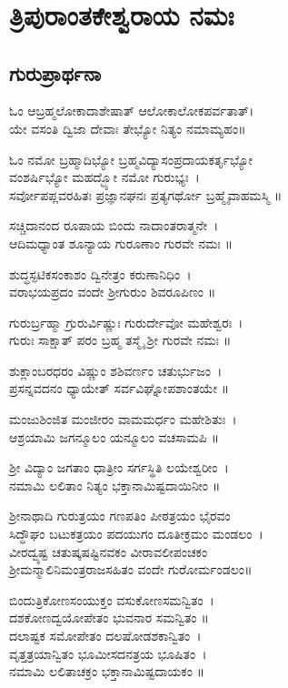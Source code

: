 ‌\setcounter{page}{0}
\thispagestyle{empty}
\fancyhead[RL]{}
\chapter*{\\ ತ್ರಿಪುರಾಂತಕೇಶ್ವರಾಯ ನಮಃ}
\thispagestyle{empty}
\section{ಗುರುಪ್ರಾರ್ಥನಾ}
ಓಂ ಆಬ್ರಹ್ಮಲೋಕಾದಾಶೇಷಾತ್ ಆಲೋಕಾಲೋಕಪರ್ವತಾತ್।\\
ಯೇ ವಸಂತಿ ದ್ವಿಜಾ ದೇವಾಃ ತೇಭ್ಯೋ ನಿತ್ಯಂ ನಮಾಮ್ಯಹಂ॥

ಓಂ ನಮೋ ಬ್ರಹ್ಮಾದಿಭ್ಯೋ ಬ್ರಹ್ಮವಿದ್ಯಾಸಂಪ್ರದಾಯಕರ್ತೃಭ್ಯೋ \\ವಂಶರ್ಷಿಭ್ಯೋ ಮಹದ್ಭ್ಯೋ ನಮೋ ಗುರುಭ್ಯಃ~।\\
ಸರ್ವೋಪಪ್ಲವರಹಿತಃ ಪ್ರಜ್ಞಾನಘನಃ ಪ್ರತ್ಯಗರ್ಥೋ ಬ್ರಹ್ಮೈವಾಹಮಸ್ಮಿ ॥

ಸಚ್ಚಿದಾನಂದ ರೂಪಾಯ ಬಿಂದು ನಾದಾಂತರಾತ್ಮನೇ~।\\
ಆದಿಮಧ್ಯಾಂತ ಶೂನ್ಯಾಯ ಗುರೂಣಾಂ ಗುರವೇ ನಮಃ ॥

ಶುದ್ಧಸ್ಫಟಿಕಸಂಕಾಶಂ ದ್ವಿನೇತ್ರಂ ಕರುಣಾನಿಧಿಂ~।\\
ವರಾಭಯಪ್ರದಂ ವಂದೇ ಶ್ರೀಗುರುಂ ಶಿವರೂಪಿಣಂ ॥

ಗುರುರ್ಬ್ರಹ್ಮಾ ಗ್ರುರುರ್ವಿಷ್ಣುಃ ಗುರುರ್ದೇವೋ ಮಹೇಶ್ವರಃ~।\\
ಗುರುಃ ಸಾಕ್ಷಾತ್ ಪರಂ ಬ್ರಹ್ಮ ತಸ್ಮೈ ಶ್ರೀ ಗುರವೇ ನಮಃ ॥

ಶುಕ್ಲಾಂಬರಧರಂ ವಿಷ್ಣುಂ ಶಶಿವರ್ಣಂ ಚತುರ್ಭುಜಂ~।\\
ಪ್ರಸನ್ನವದನಂ ಧ್ಯಾಯೇತ್ ಸರ್ವವಿಘ್ನೋಪಶಾಂತಯೇ ॥

ಮಂಜುಶಿಂಜಿತ ಮಂಜೀರಂ ವಾಮಮರ್ಧಂ ಮಹೇಶಿತುಃ~।\\
ಆಶ್ರಯಾಮಿ ಜಗನ್ಮೂಲಂ ಯನ್ಮೂಲಂ ವಚಸಾಮಪಿ ॥

ಶ್ರೀ ವಿದ್ಯಾಂ ಜಗತಾಂ ಧಾತ್ರೀಂ ಸರ್ಗಸ್ಥಿತಿ ಲಯೇಶ್ವರೀಂ~।\\
ನಮಾಮಿ ಲಲಿತಾಂ ನಿತ್ಯಂ ಭಕ್ತಾನಾಮಿಷ್ಟದಾಯಿನೀಂ ॥

ಶ್ರೀನಾಥಾದಿ ಗುರುತ್ರಯಂ ಗಣಪತಿಂ ಪೀಠತ್ರಯಂ ಭೈರವಂ\\
ಸಿದ್ಧೌಘಂ ಬಟುಕತ್ರಯಂ ಪದಯುಗಂ ದೂತೀಕ್ರಮಂ ಮಂಡಲಂ~।\\
ವೀರದ್ವ್ಯಷ್ಟ ಚತುಷ್ಕಷಷ್ಟಿನವಕಂ ವೀರಾವಲೀಪಂಚಕಂ\\
ಶ್ರೀಮನ್ಮಾಲಿನಿಮಂತ್ರರಾಜಸಹಿತಂ ವಂದೇ ಗುರೋರ್ಮಂಡಲಂ॥

ಬಿಂದುತ್ರಿಕೋಣಸಂಯುಕ್ತಂ ವಸುಕೋಣಸಮನ್ವಿತಂ~।\\
ದಶಕೋಣದ್ವಯೋಪೇತಂ ಭುವನಾರ ಸಮನ್ವಿತಂ ॥\\
ದಲಾಷ್ಟಕ ಸಮೋಪೇತಂ ದಲಷೋಡಶಕಾನ್ವಿತಂ~।\\
ವೃತ್ತತ್ರಯಾನ್ವಿತಂ ಭೂಮೀಸದನತ್ರಯ ಭೂಷಿತಂ~।\\
ನಮಾಮಿ ಲಲಿತಾಚಕ್ರಂ ಭಕ್ತಾನಾಮಿಷ್ಟದಾಯಕಂ ॥
